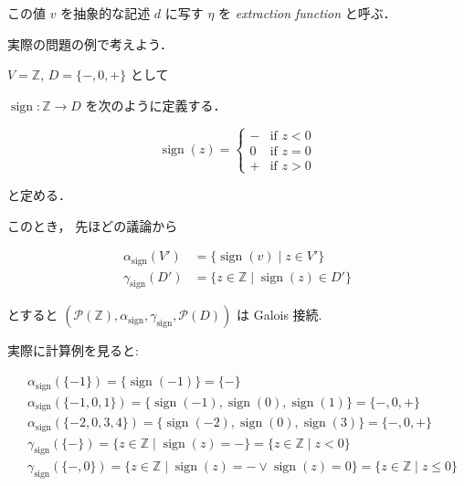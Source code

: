 \documentclass[uplatex]{jsarticle}
\begin{document}
この値 $v$ を抽象的な記述 $d$ に写す $\eta$ を \textit{extraction function} と呼ぶ．

実際の問題の例で考えよう．


$V = \mathbb{Z}$, $D = \{ \mathord{-}, 0, \mathord{+} \}$ として

$\operatorname{sign}: \mathbb{Z} \to D$ を次のように定義する．

$$
  \operatorname{sign}(z) = \begin{cases}
    \mathord{-} & \text{if } z < 0 \\
    0           & \text{if } z = 0 \\
    \mathord{+} & \text{if } z > 0
  \end{cases}
$$


と定める．

このとき， 先ほどの議論から

\begin{align*}
  \alpha_{\operatorname{sign}}(V') & = \{ \operatorname{sign}(v) \mid z \in V' \}                \\
  \gamma_{\operatorname{sign}}(D') & = \{ z \in \mathbb{Z} \mid \operatorname{sign}(z) \in D' \}
\end{align*}

とすると $(\mathcal{P}(\mathbb{Z}), \alpha_{\operatorname{sign}}, \gamma_{\operatorname{sign}}, \mathcal{P}(D))$ は Galois 接続.

実際に計算例を見ると:

\begin{align*}
   & \alpha_{\operatorname{sign}}(\{-1 \})          = \{ \operatorname{sign}(-1) \}                                                           = \{-\}                                \\
   & \alpha_{\operatorname{sign}}(\{-1, 0, 1\})     = \{ \operatorname{sign}(-1), \operatorname{sign}(0), \operatorname{sign}(1) \}           = \{-, 0, +\}                          \\
   & \alpha_{\operatorname{sign}}(\{-2, 0, 3, 4\})  = \{ \operatorname{sign}(-2), \operatorname{sign}(0), \operatorname{sign}(3) \}           = \{-, 0, +\}                          \\
   & \gamma_{\operatorname{sign}}(\{-\})            = \{ z \in \mathbb{Z} \mid \operatorname{sign}(z) = - \}                                  = \{ z \in \mathbb{Z} \mid z < 0 \}    \\
   & \gamma_{\operatorname{sign}}(\{-, 0\})         = \{ z \in \mathbb{Z} \mid \operatorname{sign}(z) = - \lor \operatorname{sign}(z) = 0 \}  = \{ z \in \mathbb{Z} \mid z \leq 0 \} \\
\end{align*}
\end{document}
